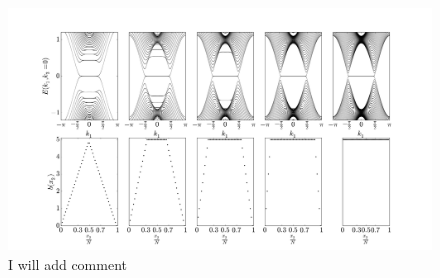 \documentclass[%
 preprint,
 amsmath,amssymb,
 aps,
]{revtex4-1}
\begin{document}
\begin{figure}[h!]
\begin{center}
\includegraphics[width=1\textwidth]{lll.pdf}
\caption{I will  add comment}
\end{center}
\end{figure}
\end{document}
